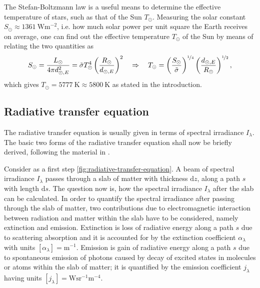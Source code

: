 \documentclass[a4paper,12pt]{report}
\def\lk#1{{\color{black}{#1}}}
\begin{document}
The Stefan-Boltzmann law is a useful means to determine the effective temperature of stars, such as that of the Sun $T_\odot$. Measuring the solar constant $S_\odot \approx \SI{1361}{\watt\meter^{-2}}$, i.e. how much solar power per unit square the Earth receives on average, one can find out the effective temperature $T_\odot$ of the Sun by means of relating the two quantities as \begin{equation}
S_\odot = \frac{L_\odot}{4\pi d_{\odot,E}^2} = \tilde{\sigma}T_\odot^4\left(\frac{R_\odot}{d_{\odot,E}}\right)^2 \quad \Rightarrow \quad T_{\odot} = \left(\frac{S_\odot}{\tilde{\sigma}}\right)^{\nicefrac{1}{4}}\left(\frac{d_{\odot,E}}{R_\odot}\right)^{\nicefrac{1}{2}},
\end{equation} which gives $T_\odot = \SI{5777}{\kelvin} \approx \SI{5800}{\kelvin}$ as stated in the introduction. 

\subsection{Radiative transfer equation}
The radiative transfer equation is usually given in terms of spectral irradiance $I_\lambda$. The basic two forms of the radiative transfer equation shall now be briefly derived, following the material in \cite[pp.27-40]{Rutten.2015}.

Consider as a first step \cref{fig:radiative-transfer-equation}. A beam of spectral irradiance $I_\lambda$ passes through a slab of matter with thickness $\mathrm{d}z$, along a path $s$ with length $\mathrm{d}s$. The question now is, how the spectral irradiance $I_\lambda$ after the slab can be calculated. In order to quantify the spectral irradiance after passing through the slab of matter, two contributions due to electromagnetic interaction between radiation and matter within the slab have to be considered, namely extinction and emission. Extinction is loss of radiative energy along a path $s$ due to scattering \lk{and/or} absorption and it is accounted for by the extinction coefficient $\alpha_\lambda$ with units $[\alpha_\lambda] = \si{\meter^{-1}}$. Emission is gain of radiative energy along a path $s$ due to spontaneous emission of photons caused by decay of excited states in molecules or atoms within the slab of matter; it is quantified by the emission coefficient $j_\lambda$ having units $[j_\lambda] = \si{\watt\steradian^{-1}\meter^{-4}}$.
\end{document}
